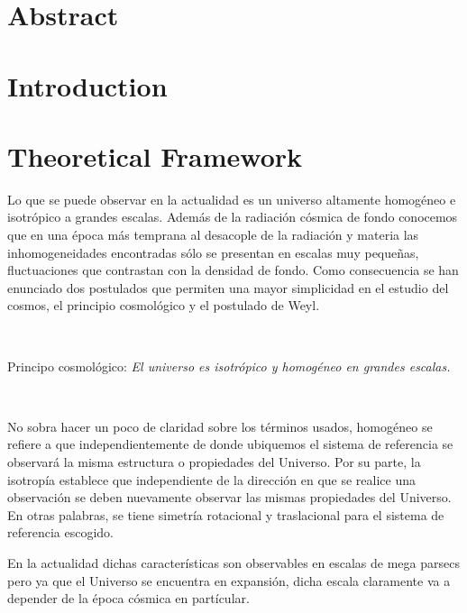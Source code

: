 \documentclass[a4,useAMS,usenatbib,usegraphicx,12pt]{article}
\begin{document}
\section{Abstract}
\newpage


\section{Introduction}


\section{Theoretical Framework}


Lo que se puede observar en la actualidad es un universo altamente homogéneo 
e isotrópico a grandes escalas. Además de la radiación cósmica de fondo 
conocemos que en una época más temprana al desacople de la radiación y materia
las inhomogeneidades encontradas sólo se presentan en escalas muy pequeñas, 
fluctuaciones que contrastan con la densidad de fondo.  
Como consecuencia se han enunciado dos postulados que permiten  una mayor 
simplicidad en el estudio del cosmos, el principio cosmológico y el postulado 
de Weyl. 


\

Principo cosmol\'ogico: \emph{El universo es isotr\'opico y homog\'eneo 
en grandes escalas.}

\

No sobra hacer un poco de claridad sobre los términos usados, homogéneo se 
refiere a que independientemente de donde ubiquemos el sistema de referencia se 
observará la misma estructura o propiedades del Universo. Por su parte, la
isotropía establece que independiente de la dirección en que se realice una 
observación se deben nuevamente observar las mismas propiedades del Universo. 
En otras palabras, se tiene simetría rotacional y traslacional para el sistema
de referencia escogido. 

En la actualidad dichas características son observables en escalas de mega parsecs
pero ya que el Universo se encuentra en expansión, dicha escala claramente 
va a depender de la época cósmica en partícular. 
\end{document}
